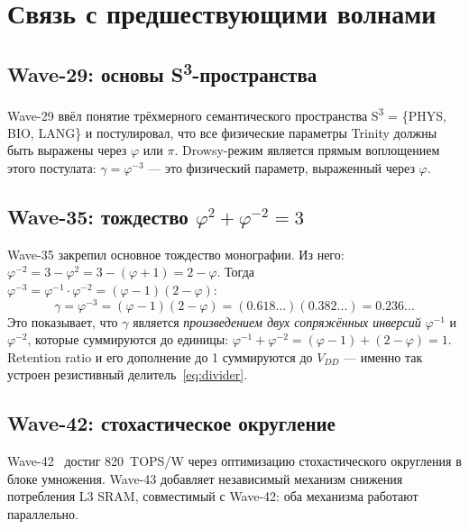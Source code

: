 \section{Связь с предшествующими волнами}
\label{sec:glava89-waves}

\subsection{Wave-29: основы S\textsuperscript{3}-пространства}

Wave-29 ввёл понятие трёхмерного семантического пространства
S\textsuperscript{3} = \{PHYS, BIO, LANG\} и постулировал,
что все физические параметры Trinity должны быть выражены
через $\varphi$ или $\pi$.
Drowsy-режим является прямым воплощением этого постулата:
$\gamma = \varphi^{-3}$ — это физический параметр,
выраженный через $\varphi$.

\subsection{Wave-35: тождество $\varphi^2 + \varphi^{-2} = 3$}

Wave-35 закрепил основное тождество монографии.
Из него: $\varphi^{-2} = 3 - \varphi^2 = 3 - (\varphi+1) = 2 - \varphi$.
Тогда $\varphi^{-3} = \varphi^{-1} \cdot \varphi^{-2} = (\varphi-1)(2-\varphi)$:
\begin{equation}
  \gamma = \varphi^{-3} = (\varphi-1)(2-\varphi)
  = (0.618...)(0.382...) = 0.236...
  \label{eq:gamma-wave35}
\end{equation}
Это показывает, что $\gamma$ является \emph{произведением двух сопряжённых
инверсий} $\varphi^{-1}$ и $\varphi^{-2}$, которые суммируются
до единицы: $\varphi^{-1} + \varphi^{-2} = (\varphi-1) + (2-\varphi) = 1$.
Retention ratio и его дополнение до 1 суммируются до $V_{DD}$ — именно так
устроен резистивный делитель~\eqref{eq:divider}.

\subsection{Wave-42: стохастическое округление}

Wave-42~\cite{trios901,trios899} достиг 820~TOPS/W
через оптимизацию стохастического округления в блоке умножения.
Wave-43 добавляет независимый механизм снижения потребления L3 SRAM,
совместимый с Wave-42: оба механизма работают параллельно.

